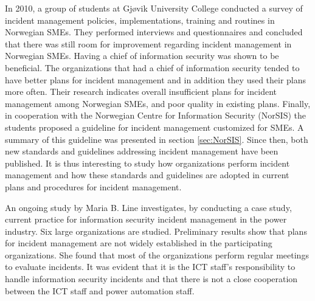 In 2010, a group of students at Gj\o vik University College conducted a survey of incident management policies, implementations, training and routines in Norwegian \acp{SME}\cite{sand2010hendelseshaandtering}. They performed interviews and questionnaires and concluded that there was still room for improvement regarding incident management in Norwegian \acp{SME}. Having a chief of information security was shown to be beneficial. The organizations that had a chief of information security tended to have better plans for incident management and in addition they used their plans more often. Their research indicates overall insufficient plans for incident management among Norwegian \acp{SME}, and poor quality in existing plans. Finally, in cooperation with the Norwegian Centre for Information Security (NorSIS) the students proposed a guideline for incident management customized for \acp{SME}. A summary of this guideline was presented in section \ref{sec:NorSIS}. Since then, both new standards and guidelines addressing incident management have been published. It is thus interesting to study how organizations perform incident management and how these standards and guidelines are adopted in current plans and procedures for incident management.

An ongoing study by Maria B. Line \cite{maria} investigates, by conducting a case study, current practice for information security incident management in the power industry. Six large organizations are studied. Preliminary results show that plans for incident management are not widely established in the participating organizations. She found that most of the organizations perform regular meetings to evaluate incidents. It was evident that it is the ICT staff's responsibility to handle information security incidents and that there is not a close cooperation between the ICT staff and power automation staff.

